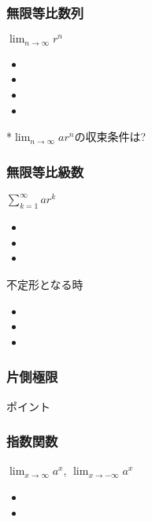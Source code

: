 \documentclass[10pt,dvipdfmx]{jsarticle}
\begin{document}
\subsubsection*{無限等比数列}
$\lim_{n\rightarrow\infty}r^n$
\begin{Large}
  \begin{itemize}
    \item \item \item \item
  \end{itemize}
\end{Large}
*$\lim_{n\rightarrow\infty}ar^n$の収束条件は?

\subsubsection*{無限等比級数}
$\sum_{k=1}^{\infty}ar^k$
\begin{Large}
  \begin{itemize}
    \item \item \item
  \end{itemize}
\end{Large}

\begin{itembox}[l]{不定形となる時}
  \begin{Large}
    \begin{itemize}
      \item \item \item
    \end{itemize}
  \end{Large}
\end{itembox}

\subsubsection*{片側極限}
\begin{itembox}[l]{ポイント}
  \vspace{15mm}
\end{itembox}

\subsubsection*{指数関数}
$\lim_{x\rightarrow\infty}a^x$, $\lim_{x\rightarrow-\infty}a^x$
\begin{Large}
  \begin{itemize}
    \item \item
  \end{itemize}
\end{Large}
\end{document}
